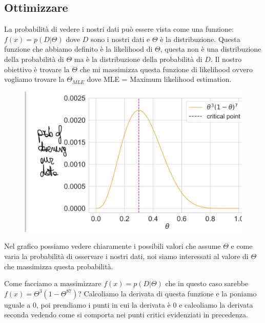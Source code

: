 \documentclass[14pt]{extreport}
\begin{document}
\subsection{Ottimizzare}
La probabilità di vedere i nostri dati può essere vista come una funzione: $f(x) = p(D|\Theta)$ dove $D$ sono i nostri dati e $\Theta$ è la
distribuzione. Questa funzione che abbiamo definito è la likelihood di $\Theta$, questa non è una distribuzione della probabilità di $\Theta$ ma è la
distribuzione della probabilità di $D$. Il nostro obiettivo è trovare la $\Theta$ che mi massimizza questa funzione di likelihood ovvero vogliamo
trovare la $\Theta_{MLE}$ dove MLE = Maximum likelihood estimation.
\begin{figure}[H]
	\centering
	\includegraphics[width=0.7\linewidth]{15.jpeg}
\end{figure}

Nel grafico possiamo vedere chiaramente i possibili valori che assume $\Theta$ e come varia la probabilità di osservare i nostri dati, noi siamo
interessati al valore di $\Theta$ che massimizza questa probabilità.

Come facciamo a massimizzare $f(x) = p(D|\Theta)$ che in questo caso sarebbe $f(x) = \Theta^3(1-\Theta^87)$? Calcoliamo la derivata di questa funzione
e la poniamo uguale a 0, poi prendiamo i punti in cui la derivata è 0 e calcoliamo la derivata seconda vedendo come si comporta nei punti critici
evidenziati in precedenza.
\end{document}
